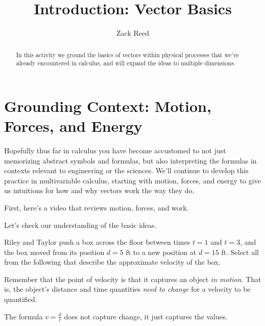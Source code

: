 \documentclass{ximera}
\title{Introduction: Vector Basics}
\author{Zack Reed}
\begin{document}
\begin{abstract}
In this activity we ground the basics of vectors within physical processes that we've already encountered in calculus, and will expand the ideas to multiple dimensions.
\end{abstract}
\maketitle

\section*{Grounding Context: Motion, Forces, and Energy}
Hopefully thus far in calculus you have become accustomed to not just memorizing abstract symbols and formulas, but also interpreting the formulas in contexts relevant to engineering or the sciences. We'll continue to develop this practice in multivariable calculus, starting with motion, forces, and energy to give us intuitions for how and why vectors work the way they do.

First, here's a video that reviews motion, forces, and work.

Let's check our understanding of the basic ideas.

\begin{problem}
Riley and Taylor push a box across the floor between times $t=1$ and $t=3$, and the box moved from its position $d=5$ ft to a new position at $d=15$ ft. Select all from the following that describe the approximate velocity of the box.
\begin{selectAll}
\end{selectAll}
\begin{feedback}
Remember that the point of velocity is that it captures an object \emph{in motion}. That is, the object's distance and time quantities \emph{need to change} for a velocity to be quantified. 

The formula $v=\frac{d}{t}$ does not capture change, it just captures the values.
\end{feedback}
\end{problem}
\end{document}

